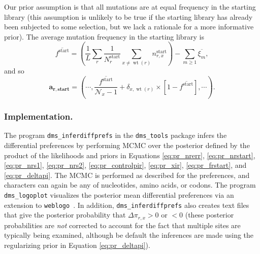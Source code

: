\documentclass[twocolumn]{bmcart}%
\begin{document}
Our prior assumption is that all mutations are at equal frequency in the starting library (this assumption is unlikely to be true if the starting library has already been subjected to some selection, but we lack a rationale for a more informative prior). The average mutation frequency in the starting library is
\begin{equation}
\label{eq:avgfstart}
\overline{f^{\textrm{start}}} = \left(\frac{1}{L}\sum\limits_r \frac{1}{N_r^{\textrm{start}}}\sum\limits_{x\ne \operatorname{wt}\left(r\right)} n_{r,x}^{\textrm{start}}\right) - \sum\limits_{m \ge 1} \overline{\xi_m},
\end{equation}
and so 
\begin{equation}
\label{eq:arstart}
\boldsymbol{\mathbf{a_{r,\textbf{start}}}}= \left(\cdots, \frac{\overline{f^{\textrm{start}}}}{\mathcal{N}_x - 1} + \delta_{x,\operatorname{wt}\left(r\right)} \times \left[1 - \overline{f^{\textrm{start}}}\right] ,\cdots\right).
\end{equation}

\subsubsection*{Implementation.}
The program \texttt{dms\_inferdiffprefs} in the \texttt{dms\_tools} package infers the differential preferences by performing MCMC over the posterior defined by the product of the likelihoods and priors in Equations \ref{eq:pr_nrerr}, \ref{eq:pr_nrstart}, \ref{eq:pr_nrs1}, \ref{eq:pr_nrs2}, \ref{eq:pr_controlpir}, \ref{eq:pr_xir}, \ref{eq:pr_frstart}, and \ref{eq:pr_deltapi}. The MCMC is performed as described for the preferences, and characters can again be any of nucleotides, amino acids, or codons. The program \texttt{dms\_logoplot} visualizes the posterior mean differential preferences via an extension to \texttt{weblogo}~\cite{crooks2004}. In addition, \texttt{dms\_inferdiffprefs} also creates text files that give the posterior probability that $\Delta\pi_{r,x} > 0$ or $< 0$ (these posterior probabilities are \emph{not} corrected to account for the fact that multiple sites are typically being examined, although be default the inferences are made using the regularizing prior in Equation \ref{eq:pr_deltapi}).
\end{document}
